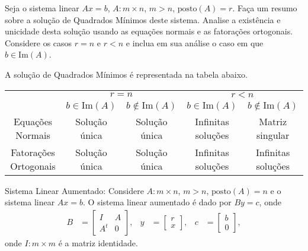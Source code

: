 \documentclass[a4paper,12pt, leqno, answers]{exam}
\begin{document}
\begin{questions}
    \question Seja o sistema linear $A x = b$, $A : m \times n$, $m > n$, $\text{posto}(A) = r$. Fa\c{c}a um resumo sobre a solu\c{c}\~{a}o de Quadrados M\'{i}nimos deste sistema. Analise a exist\^{e}ncia e unicidade desta solu\c{c}\~{a}o usando as equa\c{c}\~{o}es normais e as fatora\c{c}\~{o}es ortogonais. Considere os casos $r = n$ e $r < n$ e inclua em sua an\'{a}lise o caso em que $b \in \text{Im}(A)$.
    \begin{solution}
        A solu\c{c}\~{a}o de Quadrados M\'{i}nimos \'{e} representada na tabela abaixo.
        \begin{center}
            \begin{tabular}{|c|c|c|c|c|}
                \cline{2-5}
                \multicolumn{1}{c|}{} & \multicolumn{2}{|c|}{$r = n$} & \multicolumn{2}{|c|}{$r < n$} \\ \cline{2-5}
                \multicolumn{1}{c|}{} & $b \in \text{Im}(A)$ & $b \not\in \text{Im}(A)$ & $b \in \text{Im}(A)$ & $b \not\in \text{Im}(A)$ \\ \hline
                Equa\c{c}\~{o}es Normais & Solu\c{c}\~{a}o \'{u}nica & Solu\c{c}\~{a}o \'{u}nica & Infinitas solu\c{c}\~{o}es & Matriz singular \\ \hline
                Fatora\c{c}\~{o}es Ortogonais & Solu\c{c}\~{a}o \'{u}nica & Solu\c{c}\~{a}o \'{u}nica & Infinitas solu\c{c}\~{o}es & Infinitas solu\c{c}\~{o}es \\ \hline
            \end{tabular}
        \end{center}
    \end{solution}

    \question Sistema Linear Aumentado: Considere $A : m \times n$, $m > n$, $\text{posto}(A) = n$ e o sistema linear $A x = b$. O sistema linear aumentado \'{e} dado por $B y = c$, onde
    \begin{align*}
        B &= \begin{bmatrix}
            I & A \\
            A^t & 0
        \end{bmatrix}, & y &= \begin{bmatrix}
            r \\
            x
        \end{bmatrix}, & c &= \begin{bmatrix}
            b \\
            0
        \end{bmatrix},
    \end{align*}
    onde $I : m \times m$ \'{e} a matriz identidade.


\end{questions}
\end{document}
